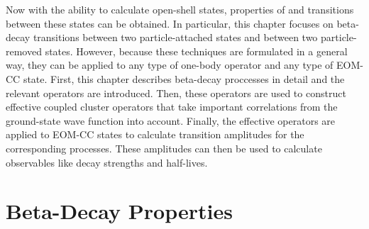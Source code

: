 \documentclass[thesis.tex]{subfiles}
\begin{document}
Now with the ability to calculate open-shell states, properties of and transitions between these states can be obtained.  In particular, this chapter focuses on beta-decay transitions between two particle-attached states and between two particle-removed states.  However, because these techniques are formulated in a general way, they can be applied to any type of one-body operator and any type of EOM-CC state.  First, this chapter describes beta-decay proccesses in detail and the relevant operators are introduced.  Then, these operators are used to construct effective coupled cluster operators that take important correlations from the ground-state wave function into account.  Finally, the effective operators are applied to EOM-CC states to calculate transition amplitudes for the corresponding processes.  These amplitudes can then be used to calculate observables like decay strengths and half-lives.

\section{Beta-Decay Properties} \label{section:betaproperties}
\end{document}
